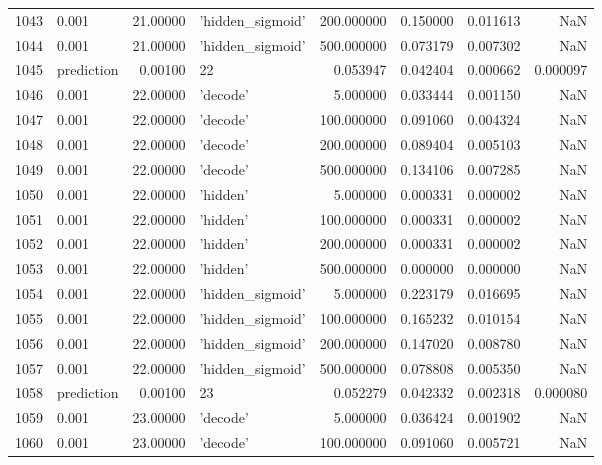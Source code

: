 \documentclass[10pt,a4paper]{article}
\begin{document}
\begin{tabular}{llrlrrrr}
1043 &       0.001 &  21.00000 &   'hidden\_sigmoid' &  200.000000 &  0.150000 &  0.011613 &       NaN \\
1044 &       0.001 &  21.00000 &   'hidden\_sigmoid' &  500.000000 &  0.073179 &  0.007302 &       NaN \\
1045 &  prediction &   0.00100 &                 22 &    0.053947 &  0.042404 &  0.000662 &  0.000097 \\
1046 &       0.001 &  22.00000 &           'decode' &    5.000000 &  0.033444 &  0.001150 &       NaN \\
1047 &       0.001 &  22.00000 &           'decode' &  100.000000 &  0.091060 &  0.004324 &       NaN \\
1048 &       0.001 &  22.00000 &           'decode' &  200.000000 &  0.089404 &  0.005103 &       NaN \\
1049 &       0.001 &  22.00000 &           'decode' &  500.000000 &  0.134106 &  0.007285 &       NaN \\
1050 &       0.001 &  22.00000 &           'hidden' &    5.000000 &  0.000331 &  0.000002 &       NaN \\
1051 &       0.001 &  22.00000 &           'hidden' &  100.000000 &  0.000331 &  0.000002 &       NaN \\
1052 &       0.001 &  22.00000 &           'hidden' &  200.000000 &  0.000331 &  0.000002 &       NaN \\
1053 &       0.001 &  22.00000 &           'hidden' &  500.000000 &  0.000000 &  0.000000 &       NaN \\
1054 &       0.001 &  22.00000 &   'hidden\_sigmoid' &    5.000000 &  0.223179 &  0.016695 &       NaN \\
1055 &       0.001 &  22.00000 &   'hidden\_sigmoid' &  100.000000 &  0.165232 &  0.010154 &       NaN \\
1056 &       0.001 &  22.00000 &   'hidden\_sigmoid' &  200.000000 &  0.147020 &  0.008780 &       NaN \\
1057 &       0.001 &  22.00000 &   'hidden\_sigmoid' &  500.000000 &  0.078808 &  0.005350 &       NaN \\
1058 &  prediction &   0.00100 &                 23 &    0.052279 &  0.042332 &  0.002318 &  0.000080 \\
1059 &       0.001 &  23.00000 &           'decode' &    5.000000 &  0.036424 &  0.001902 &       NaN \\
1060 &       0.001 &  23.00000 &           'decode' &  100.000000 &  0.091060 &  0.005721 &       NaN \\

\end{tabular}
\end{document}
